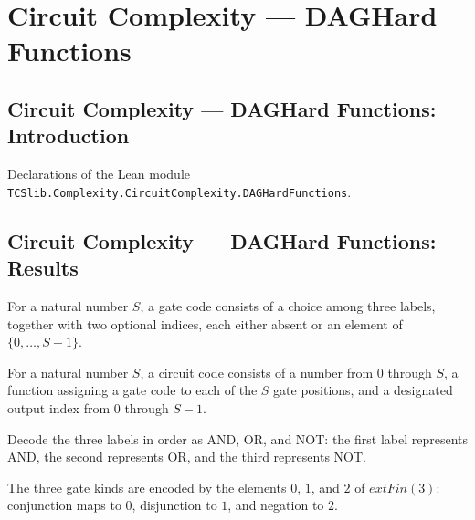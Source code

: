\section{Circuit Complexity --- DAGHard Functions}
\subsection*{Circuit Complexity --- DAGHard Functions: Introduction}

Declarations of the Lean module \texttt{TCSlib.Complexity.CircuitComplexity.DAGHardFunctions}.

\subsection*{Circuit Complexity --- DAGHard Functions: Results}

\begin{definition}
\label{BoolCircuit.GateCode}
\leanok
For a natural number $S$, a gate code consists of a choice among three labels, together
with two optional indices, each either absent or an element of $\{0,\ldots,S-1\}$.
\end{definition}

\begin{definition}
\label{BoolCircuit.CircCode}
\leanok
{}
For a natural number $S$, a circuit code consists of a number from $0$ through $S$, a
function assigning a gate code to each of the $S$ gate positions, and a designated
output index from $0$ through $S-1$.
\end{definition}

\begin{definition}
\label{BoolCircuit.decodeKind}
\leanok
{}
Decode the three labels in order as AND, OR, and NOT: the first label represents AND,
the second represents OR, and the third represents NOT.
\end{definition}

\begin{definition}
\label{BoolCircuit.encodeKind}
\leanok
{}
The three gate kinds are encoded by the elements $0$, $1$, and $2$ of $	ext{Fin}(3)$:
conjunction maps to $0$, disjunction to $1$, and negation to $2$.
\end{definition}

